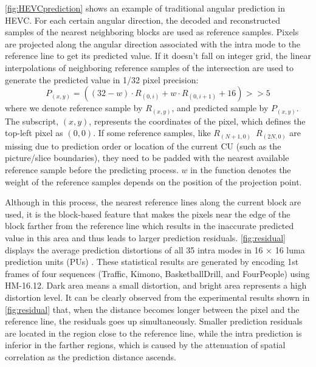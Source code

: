 \documentclass[journal]{IEEEtran}
\begin{document}
\autoref{fig:HEVCprediction} shows an example of traditional angular prediction in HEVC. For each certain angular direction, the decoded and reconstructed samples of the nearest neighboring blocks are used as reference samples. Pixels are projected along the angular direction associated with the intra mode to the reference line to get its predicted value. If it doesn't fall on integer grid, the linear interpolations of neighboring reference samples of the intersection are used to generate the predicted value in 1/32 pixel precision:
\begin{equation}
    P_{(x,y)} =((32-w)\cdot R_{(0,i)} +w\cdot R_{(0,i+1)} +16)>>5
\end{equation}
where we denote reference sample by $R_{(x,y)}$, and predicted sample by $P_{(x,y)}$. The subscript, $(x,y)$, represents the coordinates of the pixel, which defines the top-left pixel as $(0,0)$. If some reference samples, like $R_{(N+1,0)}$~$R_{(2N,0)}$ are missing due to prediction order or location of the current CU (such as the picture/slice boundaries), they need to be padded with the nearest available reference sample before the predicting process. $w$ in the function denotes the weight of the reference samples depends on the position of the projection point.

Although in this process, the nearest reference lines along the current block are used, it is the block-based feature that makes the pixels near the edge of the block farther from the reference line which results in the inaccurate predicted value in this area and thus leads to larger prediction residuals. \autoref{fig:residual} displays the average prediction distortions of all 35 intra modes in 16 × 16 luma prediction units (PUs) \cite{08}. These statistical results are generated by encoding 1st frames of four sequences (Traffic, Kimono, BasketballDrill, and FourPeople) using HM-16.12. Dark area means a small distortion, and bright area represents a high distortion level. It can be clearly observed from the experimental results shown in \autoref{fig:residual} that, when the distance becomes longer between the pixel and the reference line, the residuals goes up simultaneously. Smaller prediction residuals are located in the region close to the reference line, while the intra prediction is inferior in the farther regions, which is caused by the attenuation of spatial correlation as the prediction distance ascends.
\end{document}
